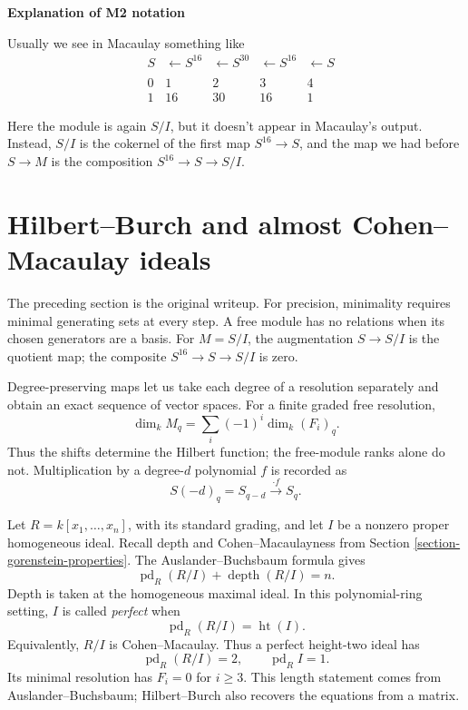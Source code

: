 \medskip\noindent
{\bf Explanation of M2 notation}

\noindent
Usually we see in Macaulay something like
\[
\begin{array}{cccccc}
      & S      & \xleftarrow{} S^{16} & \xleftarrow{} S^{30} & 
	\xleftarrow{} S^{16} & \xleftarrow{} S \\
      &        &        &        &        &    \\
      & 0      & 1      & 2      & 3      & 4      \\
      & 1      & 16     & 30     & 16     & 1
\end{array}
\]

Here the module is again $S/I$, but it
doesn't appear in Macaulay's output. Instead,
$S/I$ is the cokernel of the first map
$S^{16}\to S$, and the map we had before $S
\to M$ is the composition $S^{16}\to S \to
S/I$.



\section{Hilbert--Burch and
almost Cohen--Macaulay ideals}
\label{section-hilbert-burch}

\begin{remark}
\label{remark-resolution-conventions}
The preceding section is the original
writeup. For precision, minimality requires
minimal generating sets at every step.
A free module has no relations when its
chosen generators are a basis.
For $M=S/I$, the augmentation $S\to S/I$
is the quotient map; the composite
$S^{16}\to S\to S/I$ is zero.

Degree-preserving maps let us take each
degree of a resolution separately and
obtain an exact sequence of vector spaces.
For a finite graded free resolution,
$$
\dim_k M_q
=\sum_i(-1)^i\dim_k(F_i)_q.
$$
Thus the shifts determine the Hilbert
function; the free-module ranks alone
do not. Multiplication by a degree-$d$
polynomial $f$ is recorded as
$$
S(-d)_q=S_{q-d}
\xrightarrow{\cdot f}S_q.
$$
\end{remark}

Let $R=k[x_1,\ldots,x_n]$, with its
standard grading, and let $I$ be a
nonzero proper homogeneous ideal.
Recall depth and Cohen--Macaulayness from
Section \ref{section-gorenstein-properties}.
The Auslander--Buchsbaum formula gives
$$
\operatorname{pd}_R(R/I)
+\operatorname{depth}(R/I)=n.
$$
Depth is taken at the homogeneous maximal
ideal. In this polynomial-ring setting,
$I$ is called {\it perfect} when
$$
\operatorname{pd}_R(R/I)
=\operatorname{ht}(I).
$$
Equivalently, $R/I$ is Cohen--Macaulay.
Thus a perfect height-two ideal has
$$
\operatorname{pd}_R(R/I)=2,
\qquad\operatorname{pd}_R I=1.
$$
Its minimal resolution has $F_i=0$ for
$i\geq3$. This length statement comes from
Auslander--Buchsbaum; Hilbert--Burch also
recovers the equations from a matrix.

